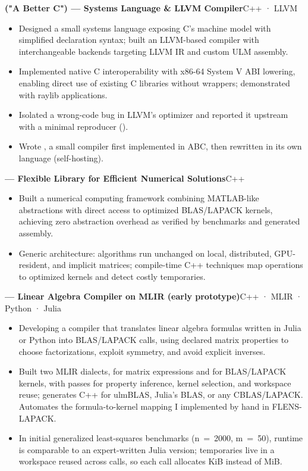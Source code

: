 \documentclass[10pt]{article}
\makeatletter
\newcommand{\link}[2]{\href{#1}{\textcolor{link}{\linkUnderLine{#2}}}}
\newcommand{\smallsize}{\fontsize{9.5bp}{11.45bp}\selectfont}
\newcommand{\cv@entryskip}{4.6bp}
\newcommand{\cventry}[2]{%
  \par\addvspace{\cv@entryskip}%
  {\bfseries #1}\hfill{\smallsize #2}\kern0.85bp\par %
  \nopagebreak
  \gdef\cv@entryskip{4.1bp}%
}
\newenvironment{cvitems}
  {\begin{itemize}[label=•, leftmargin=15bp, labelwidth=10bp, labelsep=0bp,
                   align=left, topsep=0.55bp, partopsep=0bp, parsep=0bp,
                   itemsep=1.5bp, beginpenalty=10000]}
  {\end{itemize}\gdef\cv@entryskip{4.6bp}}
\makeatother
\begin{document}
\cventry{{\mdseries\link{https://github.com/michael-lehn/abc-llvm}{ABC}} ("A Better C") — Systems Language \& LLVM Compiler}{C++ · LLVM}
\begin{cvitems}
  \item Designed a small systems language exposing C's machine model with simplified declaration syntax; built an LLVM-based compiler with interchangeable backends targeting LLVM IR and custom ULM assembly.
  \item Implemented native C interoperability with x86-64 System V ABI lowering, enabling direct use of existing C libraries without wrappers; demonstrated with raylib applications.
  \item Isolated a wrong-code bug in LLVM's optimizer and reported it upstream with a minimal reproducer (\mbox{\link{https://github.com/llvm/llvm-project/issues/235074}{\#235074}}).
  \item Wrote \link{https://github.com/michael-lehn/not-abc}{not-abc}, a small compiler first implemented in ABC, then rewritten in its own language (self-hosting).
\end{cvitems}

\cventry{{\mdseries\link{https://github.com/michael-lehn/FLENS}{FLENS}} — Flexible Library for Efficient Numerical Solutions}{C++}
\begin{cvitems}
  \item Built a numerical computing framework combining MATLAB-like abstractions with direct access to optimized BLAS/LAPACK kernels, achieving zero abstraction overhead as verified by benchmarks and generated assembly.
  \item Generic architecture: algorithms run unchanged on local, distributed, GPU-resident, and implicit matrices; compile-time C++ techniques map operations to optimized kernels and detect costly temporaries.
\end{cvitems}

\cventry{{\mdseries\link{https://github.com/michael-lehn/ulm-lam}{ulm.lam}} — Linear Algebra Compiler on MLIR (early prototype)}{C++ · MLIR · Python · Julia}
\begin{cvitems}
  \item Developing a compiler that translates linear algebra formulas written in Julia or Python into BLAS/LAPACK calls, using declared matrix properties to choose factorizations, exploit symmetry, and avoid explicit inverses.
  \item Built two MLIR dialects, for matrix expressions and for BLAS/LAPACK kernels, with passes for property inference, kernel selection, and workspace reuse; generates C++ for ulmBLAS, Julia's BLAS, or any CBLAS/LAPACK. Automates the formula-to-kernel mapping I implemented by hand in FLENS-LAPACK.
  \item In initial generalized least-squares benchmarks (n~=~2000, m~=~50), runtime is comparable to an expert-written Julia version; temporaries live in a workspace reused across calls, so each call allocates KiB instead of MiB.
\end{cvitems}
\end{document}
